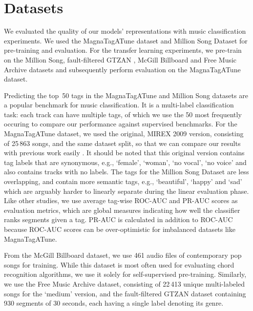 \chapter{Datasets}


We evaluated the quality of our models' representations with music classification experiments. We used the MagnaTagATune \cite{law2009evaluation} dataset and Million Song Dataset \cite{Bertin-Mahieux2011} for pre-training and evaluation. For the transfer learning experiments, we pre-train on the Million Song, fault-filtered GTZAN \cite{tzanetakis2002musical,sturm2013gtzan}, McGill Billboard \cite{burgoyne_billboard} and Free Music Archive \cite{fma_dataset} datasets and subsequently perform evaluation on the MagnaTagATune dataset. 

Predicting the top~50 tags in the Magna\-Tag\-A\-Tune and Million Song datasets are a popular benchmark for music classification. It is a multi-label classification task: each track can have multiple tags, of which we use the 50 most frequently occuring to compare our performance against supervised benchmarks. 
For the Magna\-Tag\-A\-Tune dataset, we used the original, MIREX 2009 version, consisting of 25\,863 songs, and the same dataset split, so that we can compare our results with previous work easily \cite{pons_end--end_2017, lee2018samplecnn, dieleman_feature_learning}. It should be noted that this original version contains tag labels that are synonymous, e.g., `female', `woman', `no vocal', `no voice' and also contains tracks with no labels. The tags for the Million Song Dataset are less overlapping, and contain more semantic tags, e.g., `beautiful', `happy' and `sad' which are arguably harder to linearly separate during the linear evaluation phase.
Like other studies, we use average tag-wise ROC-AUC and PR-AUC scores as evaluation metrics, which are global measures indicating how well the classifier ranks segments given a tag. PR-AUC is calculated in addition to ROC-AUC because ROC-AUC scores can be over-optimistic for imbalanced datasets like Magna\-Tag\-A\-Tune\cite{pons_end--end_2017}. 

From the McGill Billboard dataset, we use 461 audio files of contemporary pop songs for training. While this dataset is most often used for evaluating chord recognition algorithms, we use it solely for self-supervised pre-training.
Similarly, we use the Free Music Archive dataset, consisting of 22\,413 unique multi-labeled songs for the `medium' version, and the fault-filtered GTZAN dataset containing 930 segments of 30 seconds, each having a single label denoting its genre.


